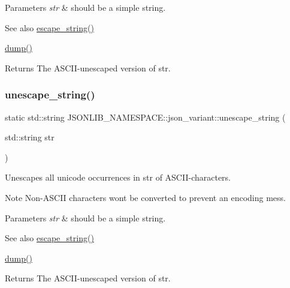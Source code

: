 \begin{DoxyParams}{Parameters}
{\em str} & should be a simple string. \\
\hline
\end{DoxyParams}
\begin{DoxySeeAlso}{See also}
\hyperlink{classJSONLIB__NAMESPACE_1_1json__variant_a4c2354098f97b91b5a07dbda981673cf}{escape\+\_\+string()} 

\hyperlink{classJSONLIB__NAMESPACE_1_1json__variant_a72d4a39d77b76f076354219edc6ea4a0}{dump()} 
\end{DoxySeeAlso}
\begin{DoxyReturn}{Returns}
The A\+S\+C\+I\+I-\/unescaped version of {\ttfamily str}. 
\end{DoxyReturn}
\mbox{\label{classJSONLIB__NAMESPACE_1_1json__variant_ab41402ea9062a5c4688834e734486646}} 
\subsubsection{\texorpdfstring{unescape\+\_\+string()}{unescape\_string()}\hspace{0.1cm}{\footnotesize\ttfamily [2/2]}}
{\footnotesize\ttfamily static std\+::string J\+S\+O\+N\+L\+I\+B\+\_\+\+N\+A\+M\+E\+S\+P\+A\+C\+E\+::json\+\_\+variant\+::unescape\+\_\+string (\begin{DoxyParamCaption}\item[{std\+::string}]{str }\end{DoxyParamCaption})\hspace{0.3cm}{\ttfamily [static]}}



Unescapes all unicode occurrences in {\ttfamily str} of A\+S\+C\+I\+I-\/characters. 

\begin{DoxyNote}{Note}
Non-\/\+A\+S\+C\+II characters won\textquotesingle{}t be converted to prevent an encoding mess. 
\end{DoxyNote}

\begin{DoxyParams}{Parameters}
{\em str} & should be a simple string. \\
\hline
\end{DoxyParams}
\begin{DoxySeeAlso}{See also}
\hyperlink{classJSONLIB__NAMESPACE_1_1json__variant_a4c2354098f97b91b5a07dbda981673cf}{escape\+\_\+string()} 

\hyperlink{classJSONLIB__NAMESPACE_1_1json__variant_a72d4a39d77b76f076354219edc6ea4a0}{dump()} 
\end{DoxySeeAlso}
\begin{DoxyReturn}{Returns}
The A\+S\+C\+I\+I-\/unescaped version of {\ttfamily str}. 
\end{DoxyReturn}


